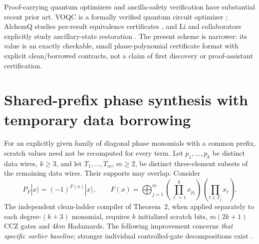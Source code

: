 \documentclass[11pt,a4paper]{article}
\begin{document}
Proof-carrying quantum optimizers
and ancilla-safety verification have
substantial recent prior art.
VOQC is a formally verified quantum
circuit optimizer \cite{voqc};
AlchemQ studies per-result
equivalence certificates \cite{alchemq},
and Li and collaborators explicitly
study ancillary-state restoration
\cite{ancillasafe}. The present
scheme is narrower: its value is
an exactly checkable, small
phase-polynomial certificate format
with explicit clean/borrowed contracts,
not a claim of first discovery or
proof-assistant certification.


\section{Shared-prefix phase synthesis with temporary data borrowing}
\label{sec:shared-prefix}
For an explicitly given family of diagonal phase monomials
with a common prefix, scratch values need not be
recomputed for every term. Let
$p_1,\ldots,p_k$ be distinct data wires, $k\ge3$,
and let $T_1,\ldots,T_m$, $m\ge2$, be distinct
three-element subsets of the remaining data wires.
Their supports may overlap. Consider
\begin{equation}\label{eq:shared-target}
P_F|x\rangle=(-1)^{F(x)}|x\rangle,\qquad
F(x)=\bigoplus_{j=1}^{m}
\left(\prod_{\ell=1}^{k}x_{p_\ell}\right)
\left(\prod_{t\in T_j}x_t\right).
\end{equation}
The independent clean-ladder compiler
of Theorem~2, when applied separately to
each degree-$(k+3)$ monomial, requires
$k$ initialized scratch bits,
$m(2k+1)$ CCZ gates and $4km$ Hadamards.
The following improvement concerns
\emph{that specific earlier baseline};
stronger individual controlled-gate
decompositions exist \cite{khattar,lee}.
\end{document}
